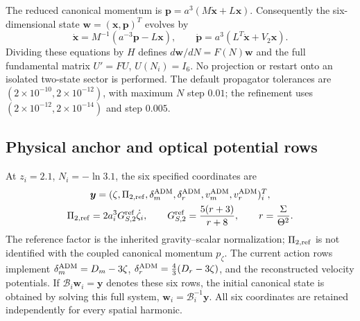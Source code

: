 The reduced canonical momentum is
$\boldsymbol{p}=a^3(M\dot{\boldsymbol{x}}+L\boldsymbol{x})$.
Consequently the six-dimensional state
$\boldsymbol{w}=(\boldsymbol{x},\boldsymbol{p})^T$ evolves by
\begin{equation}
 \dot{\boldsymbol{x}}=M^{-1}(a^{-3}\boldsymbol{p}-L\boldsymbol{x}),
 \qquad
 \dot{\boldsymbol{p}}=a^3(L^T\dot{\boldsymbol{x}}+V_2\boldsymbol{x}) .
 \label{eq:app-canonical-evolution}
\end{equation}
Dividing these equations by $H$ defines
$d\boldsymbol{w}/dN=F(N)\boldsymbol{w}$ and the full fundamental matrix
$U'=FU$, $U(N_i)=I_6$.  No projection or restart onto an isolated two-state
sector is performed.  The default propagator tolerances are
$(2\times10^{-10},2\times10^{-12})$, with maximum $N$ step $0.01$;
the refinement uses $(2\times10^{-12},2\times10^{-14})$ and step $0.005$.

\subsection{Physical anchor and optical potential rows}

At $z_i=2.1$, $N_i=-\ln3.1$, the six specified coordinates are
\begin{equation}
 \begin{gathered}
 \boldsymbol{y}=(\zeta,\Pi_{2,\rm ref},
 \delta_m^{\rm ADM},\delta_r^{\rm ADM},v_m^{\rm ADM},v_r^{\rm ADM})_i^T,
 \\
 \Pi_{2,\rm ref}=2a_i^3G_{S,2}^{\rm ref}\dot\zeta_i,
 \qquad
 G_{S,2}^{\rm ref}=\frac{5(r+3)}{r+8},\qquad r=\frac{\Sigma}{\Theta^2}.
 \end{gathered}
 \label{eq:app-physical-anchor}
\end{equation}
The reference factor is the inherited gravity--scalar normalization;
$\Pi_{2,\rm ref}$ is not identified with the coupled canonical momentum
$p_\zeta$.  The current action rows implement
$\delta_m^{\rm ADM}=D_m-3\zeta$,
$\delta_r^{\rm ADM}=\tfrac43(D_r-3\zeta)$, and the reconstructed velocity
potentials.  If $\mathcal B_i\boldsymbol{w}_i=\boldsymbol{y}$ denotes these
six rows, the initial canonical state is obtained by solving this full
system, $\boldsymbol{w}_i=\mathcal B_i^{-1}\boldsymbol{y}$.
All six coordinates are retained independently for every spatial harmonic.

